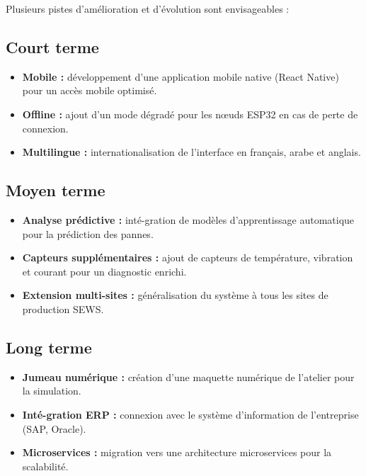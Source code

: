 Plusieurs pistes d'am\'elioration et d'\'evolution sont envisageables :

\subsection{Court terme}

\begin{itemize}
    \item \textbf{Mobile :} d\'eveloppement d'une application mobile native (React Native) pour un acc\`es mobile optimis\'e.
    \item \textbf{Offline :} ajout d'un mode d\'egrad\'e pour les n\oe{}uds ESP32 en cas de perte de connexion.
    \item \textbf{Multilingue :} internationalisation de l'interface en fran\c{c}ais, arabe et anglais.
\end{itemize}

\subsection{Moyen terme}

\begin{itemize}
    \item \textbf{Analyse pr\'edictive :} int\'e-gration de mod\`eles d'apprentissage automatique pour la pr\'ediction des pannes.
    \item \textbf{Capteurs suppl\'ementaires :} ajout de capteurs de temp\'erature, vibration et courant pour un diagnostic enrichi.
    \item \textbf{Extension multi-sites :} g\'en\'eralisation du syst\`eme \`a tous les sites de production SEWS.
\end{itemize}

\subsection{Long terme}

\begin{itemize}
    \item \textbf{Jumeau num\'erique :} cr\'eation d'une maquette num\'erique de l'atelier pour la simulation.
    \item \textbf{Int\'e-gration ERP :} connexion avec le syst\`eme d'information de l'entreprise (SAP, Oracle).
    \item \textbf{Microservices :} migration vers une architecture microservices pour la scalabilit\'e.
\end{itemize}

